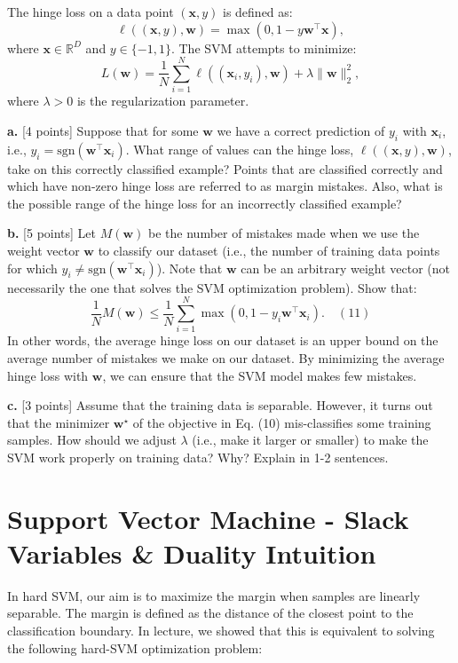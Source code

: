 \documentclass[a3paper,12pt]{extarticle} %
\begin{document}
The hinge loss on a data point $(\mathbf{x}, y)$ is defined as:
\[
\ell((\mathbf{x}, y), \mathbf{w}) = \max(0, 1 - y \mathbf{w}^\top \mathbf{x}),
\]
where $\mathbf{x} \in \mathbb{R}^D$ and $y \in \{-1, 1\}$. The SVM attempts to minimize:
\[
L(\mathbf{w}) = \frac{1}{N} \sum_{i=1}^N \ell((\mathbf{x}_i, y_i), \mathbf{w}) + \lambda \|\mathbf{w}\|_2^2,
\]
where $\lambda > 0$ is the regularization parameter.

\noindent \textbf{a.} [4 points] Suppose that for some \( \mathbf{w} \) we have a correct prediction of \( y_i \) with \( \mathbf{x}_i \), i.e., \( y_i = \text{sgn}(\mathbf{w}^\top \mathbf{x}_i) \). What range of values can the hinge loss, \( \ell((\mathbf{x}, y), \mathbf{w}) \), take on this correctly classified example? Points that are classified correctly and which have non-zero hinge loss are referred to as margin mistakes. Also, what is the possible range of the hinge loss for an incorrectly classified example?

\noindent \textbf{b.} [5 points] Let \( M(\mathbf{w}) \) be the number of mistakes made when we use the weight vector \( \mathbf{w} \) to classify our dataset (i.e., the number of training data points for which \( y_i \neq \text{sgn}(\mathbf{w}^\top \mathbf{x}_i) \)). Note that \( \mathbf{w} \) can be an arbitrary weight vector (not necessarily the one that solves the SVM optimization problem). Show that:
\[
\frac{1}{N} M(\mathbf{w}) \leq \frac{1}{N} \sum_{i=1}^N \max \left( 0, 1 - y_i \mathbf{w}^\top \mathbf{x}_i \right). \quad (11)
\]
In other words, the average hinge loss on our dataset is an upper bound on the average number of mistakes we make on our dataset. By minimizing the average hinge loss with \( \mathbf{w} \), we can ensure that the SVM model makes few mistakes.

\noindent \textbf{c.} [3 points] Assume that the training data is separable. However, it turns out that the minimizer \( \mathbf{w}^\star \) of the objective in Eq. (10) mis-classifies some training samples. How should we adjust \( \lambda \) (i.e., make it larger or smaller) to make the SVM work properly on training data? Why? Explain in 1-2 sentences.


\newpage
\section{Support Vector Machine - Slack Variables \& Duality Intuition}

In hard SVM, our aim is to maximize the margin when samples are linearly separable. The margin is defined as the distance of the closest point to the classification boundary. In lecture, we showed that this is equivalent to solving the following hard-SVM optimization problem:
\end{document}
